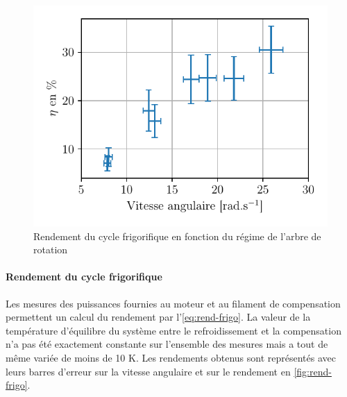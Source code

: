 \begin{minipage}{\linewidth}
    \begin{figure}
        \centering
        \vspace{-1.4cm}
        \includegraphics[width=\linewidth]{figures/rend-frigo.pdf}
        \caption{Rendement du cycle frigorifique en fonction du régime de l'arbre de rotation}
        \label{fig:rend-frigo}
    \end{figure}

    \paragraph*{Rendement du cycle frigorifique}
    Les mesures des puissances fournies au moteur et au filament de compensation permettent un calcul du rendement par l'\autoref{eq:rend-frigo}. La valeur de la température d'équilibre du système entre le refroidissement et la compensation n'a pas été exactement constante sur l'ensemble des mesures mais a tout de même variée de moins de 10 \si{\kelvin}. Les rendements obtenus sont représentés avec leurs barres d'erreur sur la vitesse angulaire et sur le rendement en \autoref{fig:rend-frigo}.
\end{minipage}


